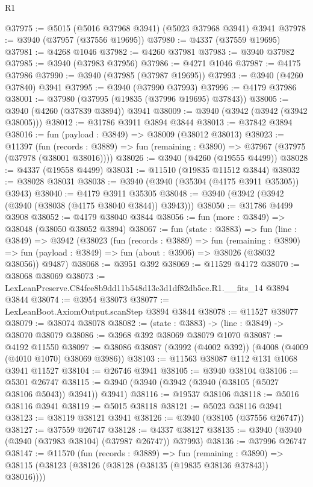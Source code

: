 \begin{lexlean}{R1}
\begin{coremodule}
@37975 := @5015 (@5016 @37968 @3941) (@5023 @37968 @3941) @3941
@37978 := @3940 (@37957 (@37556 @19695))
@37980 := @4337 (@37559 @19695)
@37981 := @4268 @1046
@37982 := @4260 @37981
@37983 := @3940 @37982
@37985 := @3940 (@37983 @37956)
@37986 := @4271 @1046
@37987 := @4175 @37986
@37990 := @3940 (@37985 (@37987 @19695))
@37993 := @3940 (@4260 @37840) @3941
@37995 := @3940 (@37990 @37993)
@37996 := @4179 @37986
@38001 := @37980 (@37995 (@19835 (@37996 @19695) @37843))
@38005 := @3940 (@4260 (@37839 @3894)) @3941
@38009 := @3940 (@3942 (@3942 (@3942 @38005)))
@38012 := @31786 @3911 @3894 @3844
@38013 := @37842 @3894
@38016 := fun (payload : @3849) => @38009 (@38012 @38013)
@38023 := @11397
    (fun (records : @3889) => fun (remaining : @3890) => @37967 (@37975 (@37978 (@38001 @38016))))
@38026 := @3940 (@4260 (@19555 @4499))
@38028 := @4337 (@19558 @4499)
@38031 := @11510 (@19835 @11512 @3844)
@38032 := @38028 @38031
@38038 := @3940 (@3940 (@35304 (@4175 @3911 @35305)) @3943)
@38040 := @4179 @3911 @35305
@38048 := @3940 (@3942 (@3942 (@3940 (@38038 (@4175 @38040 @3844)) @3943)))
@38050 := @31786 @4499 @3908
@38052 := @4179 @38040 @3844
@38056 := fun (more : @3849) => @38048 (@38050 @38052 @3894)
@38067 := fun (state : @3883) =>
  fun (line : @3849) =>
  @3942
    (@38023
      (fun (records : @3889) =>
      fun (remaining : @3890) =>
      fun (payload : @3849) => fun (about : @3906) => @38026 (@38032 @38056))
      @9487)
@38068 := @3951 @392
@38069 := @11529 @4172
@38070 := @38068 @38069
@38073 := LexLeanPreserve.C84fee8b9dd11b548d13c3d1df82db5ce.R1.__fits_14 @3894 @3844
@38074 := @3954 @38073
@38077 := LexLeanBoot.AxiomOutput.scanStep @3894 @3844
@38078 := @11527 @38077
@38079 := @38074 @38078
@38082 := (state : @3883) -> (line : @3849) -> @38070 @38079
@38086 := @3968 @392 @38069 @38079 @1070
@38087 := @4192 @11550
@38097 := @38086 @38087 (@3992 (@4002 @392)) (@4008 (@4009 (@4010 @1070) @38069 @3986))
@38103 := @11563 @38087 @112 @131 @1068 @3941 @11527
@38104 := @26746 @3941
@38105 := @3940 @38104
@38106 := @5301 @26747
@38115 := @3940 (@3940 (@3942 (@3940 (@38105 (@5027 @38106 @5043)) @3941)) @3941)
@38116 := @19537 @38106
@38118 := @5016 @38116 @3941
@38119 := @5015 @38118
@38121 := @5023 @38116 @3941
@38123 := @38119 @38121 @3941
@38126 := @3940 (@38105 (@37556 @26747))
@38127 := @37559 @26747
@38128 := @4337 @38127
@38135 := @3940 (@3940 (@3940 (@37983 @38104) (@37987 @26747)) @37993)
@38136 := @37996 @26747
@38147 := @11570
    (fun (records : @3889) =>
    fun (remaining : @3890) =>
    @38115 (@38123 (@38126 (@38128 (@38135 (@19835 @38136 @37843)) @38016))))

\end{coremodule}
\end{lexlean}
